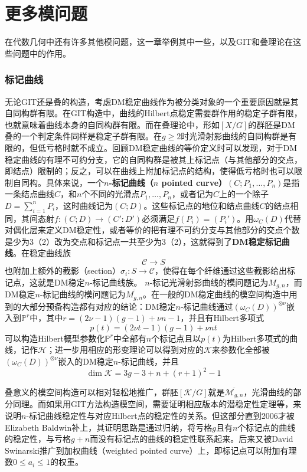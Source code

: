 \chapter{更多模问题}
在代数几何中还有许多其他模问题，这一章举例其中一些，以及GIT和叠理论在这些问题中的作用。
\subsection{标记曲线}
无论GIT还是叠的构造，考虑DM稳定曲线作为被分类对象的一个重要原因就是其自同构群有限。在GIT构造中，曲线的Hilbert点稳定需要群作用的稳定子群有限，也就意味着曲线本身的自同构群有限。而在叠理论中，形如$ [X/G] $的群胚是DM叠的一个判定条件同样是稳定子群有限。在$ g\geqslant2 $时光滑射影曲线的自同构群是有限的，但低亏格时就不成立。回顾DM稳定曲线的等价定义时可以发现，对于DM稳定曲线的有理不可约分支，它的自同构群是被其上标记点（与其他部分的交点，即结点）限制的；反之，可以在曲线上附加标记点的结构，使得低亏格时也可以限制自同构。具体来说，一个\textbf{$ n $-标记曲线（$ n $ pointed curve）}$ (C;P_1,\ldots,P_n) $是指一条结点曲线$ C $，和$ n $个不同的光滑点$ P_1,\ldots,P_n $，或者记为$ C $上的一个除子$ D=\sum_{i=1}^{n}P_i $，这时曲线记为$ (C;D) $。这些标记点的地位和结点曲线$ C $的结点相同，其间态射$ f:(C;D)\to (C':D') $必须满足$ f(P_i)=(P_i') $。用$ \omega_C(D) $代替对偶化层来定义DM稳定性，或者等价的把有理不可约分支与其他部分的交点个数是少为3（2）改为交点和标记点一共至少为3（2），这就得到了\textbf{DM稳定标记曲线}。在稳定曲线族
$$ \mathcal{C}\to S $$
也附加上额外的截影（section）$ \sigma_i:S\to \mathcal{C} $，使得在每个纤维通过这些截影给出标记点，这就是DM稳定$ n $-标记曲线族。
$ n $-标记光滑射影曲线的模问题记为$ M_{g,n} $，而DM稳定$ n $-标记曲线的模问题记为$ \overline{M_{g,n}} $。在一般的DM稳定曲线的模空间构造中用到的大部分预备构造都有对应的结论：DM稳定$ n $-标记曲线通过$ (\omega_C(D))^{\otimes \nu} $嵌入到$ \mathbb{P}^r $中，其中$ r=(2\nu-1)(g-1)+\nu n-1 $，并且有Hilbert多项式
$$ p(t)=(2\nu t-1)(g-1)+\nu nt $$
可以构造Hilbert概型参数化$ \mathbb{P}^r $中全部有$ n $个标记点且以$ p(t) $为Hilbert多项式的曲线，记作$ \mathcal{H} $；进一步用相应的形变理论可以得到对应的$ \mathcal{K} $来参数化全部被$ (\omega_C(D))^{\otimes \nu} $嵌入的DM稳定$ n $-标记曲线，并且
$$ \dim \mathcal{K}=3g-3+n+(r+1)^2-1 $$

叠意义的模空间构造可以相对轻松地推广，群胚$ [\mathcal{K}/G] $就是$ \overline{\mathscr{M}_{g,n}} $，光滑曲线的部分同理。而如果用GIT方法构造模空间，需要证明相应版本的潜稳定性定理等，来说明$ n $-标记曲线稳定性与对应Hilbert点的稳定性的关系。但这部分直到2006才被Elizabeth Baldwin补上，其证明思路是通过归纳，将亏格$ g $且有$ n $个标记点的曲线的稳定性，与亏格$ g+n $而没有标记点的曲线的稳定性联系起来。后来又被David Swinarski推广到加权曲线（weighted pointed curve）上，即标记点可以附加有理数$ 0\leqslant a_i \leqslant 1 $的权重。

